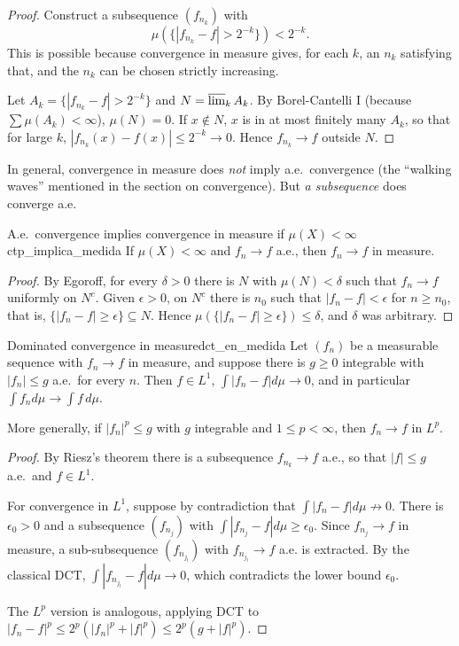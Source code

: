 \documentclass[11pt, a4paper]{article}
\begin{document}
\begin{proof}
Construct a subsequence $(f_{n_k})$ with
$$ \mu\!\left(\{|f_{n_k} - f| > 2^{-k}\}\right) < 2^{-k}. $$
This is possible because convergence in measure gives, for each $k$, an $n_k$ satisfying that, and
the $n_k$ can be chosen strictly increasing.

Let $A_k = \{|f_{n_k} - f| > 2^{-k}\}$ and $N = \varlimsup_k A_k$. By Borel-Cantelli I (because
$\sum \mu(A_k) < \infty$), $\mu(N) = 0$. If $x \notin N$, $x$ is in at most finitely many $A_k$,
so
that for large $k$, $|f_{n_k}(x) - f(x)| \le 2^{-k} \to 0$. Hence $f_{n_k} \to f$ outside $N$.
\end{proof}

\obs In general, convergence in measure does \emph{not} imply a.e.\ convergence (the ``walking
waves'' mentioned in the section on convergence). But \emph{a subsequence}
does converge a.e.

\begin{proposicion}{A.e.\ convergence implies convergence in measure if $\mu(X) < \infty$}{ctp_implica_medida}
If $\mu(X) < \infty$ and $f_n \to f$ a.e., then $f_n \to f$ in measure.
\end{proposicion}

\begin{proof}
By Egoroff, for every $\delta > 0$ there is $N$ with $\mu(N) < \delta$ such that $f_n \to f$ uniformly
on $N^c$. Given $\epsilon > 0$, on $N^c$ there is $n_0$ such that $|f_n - f| < \epsilon$ for
$n \ge n_0$,
that is, $\{|f_n - f| \ge \epsilon\} \subseteq N$. Hence $\mu(\{|f_n - f| \ge \epsilon\}) \le \delta$,
and $\delta$ was arbitrary.
\end{proof}

\begin{teorema}{Dominated convergence in measure}{dct_en_medida}
Let $(f_n)$ be a measurable sequence with $f_n \to f$ in measure, and suppose there is $g \ge 0$
integrable with $|f_n| \le g$ a.e.\ for every $n$. Then $f \in L^1$, $\int |f_n - f| d\mu
\to 0$, and in particular $\int f_n d\mu \to \int f \, d\mu$.

More generally, if $|f_n|^p \le g$ with $g$ integrable and $1 \le p < \infty$, then
$f_n \to f$ in $L^p$.
\end{teorema}

\begin{proof}
By Riesz's theorem there is a subsequence $f_{n_k} \to f$ a.e., so that $|f| \le g$ a.e.\
and $f \in L^1$.

For convergence in $L^1$, suppose by contradiction that $\int |f_n - f| d\mu \not\to 0$. There is
$\epsilon_0 > 0$ and a subsequence $(f_{n_j})$ with $\int |f_{n_j} - f| d\mu \ge \epsilon_0$. Since
$f_{n_j} \to f$ in measure, a sub-subsequence $(f_{n_{j_l}})$ with $f_{n_{j_l}} \to f$
a.e. is extracted. By the classical DCT, $\int |f_{n_{j_l}} - f| d\mu \to 0$, which contradicts the lower bound
$\epsilon_0$.

The $L^p$ version is analogous, applying DCT to $|f_n - f|^p \le 2^p (|f_n|^p + |f|^p) \le
2^p (g + |f|^p)$.
\end{proof}
\end{document}
